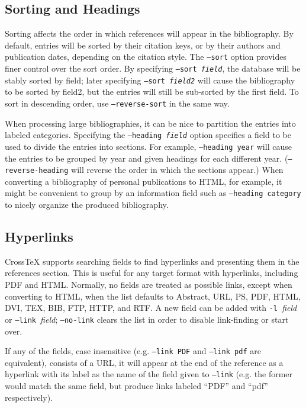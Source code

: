 \documentclass{article}
\newcommand{\XTX}{Cross\TeX}
\begin{document}
\subsection{Sorting and Headings}

Sorting affects the order in which references will appear in the
bibliography.  By default, entries will be sorted by their citation keys,
or by their authors and publication dates, depending on the citation
style.  The \texttt{--sort} option provides finer control over the
sort order. By specifying \texttt{--sort \textrm{\textit{field}}}, the
database will be stably sorted by field; later specifying \texttt{--sort
\textrm{\textit{field2}}} will cause the bibliography to be sorted by
field2, but the entries will still be sub-sorted by the first field. To
sort in descending order, use \texttt{--reverse-sort} in the same way.

When processing large bibliographies, it can be nice to partition
the entries into labeled categories. Specifying the \texttt{--heading
\textrm{\textit{field}}} option specifies a field to be used to divide
the entries into sections. For example, \texttt{--heading year} will
cause the entries to be grouped by year and given headings for each
different year. (\texttt{--reverse-heading} will reverse the order in
which the sections appear.) When converting a bibliography of personal
publications to HTML, for example, it might be convenient to group by an
information field such as \texttt{--heading category} to nicely organize
the produced bibliography.

\subsection{Hyperlinks}

\XTX{} supports searching fields to find hyperlinks and presenting them
in the references section.  This is useful for any target format with
hyperlinks, including PDF and HTML.  Normally, no fields are treated
as possible links, except when converting to HTML, when the list
defaults to Abstract, URL, PS, PDF, HTML, DVI, TEX, BIB, FTP, HTTP,
and RTF.  A new field can be added with \texttt{-l~}\textit{field} or
\texttt{--link~}\textit{field}; \texttt{--no-link} clears the list in
order to disable link-finding or start over.

If any of the fields, case insensitive (e.g. \texttt{--link~PDF} and
\texttt{--link~pdf} are equivalent), consists of a URL, it will appear
at the end of the reference as a hyperlink with its label as the name
of the field given to \texttt{--link} (e.g. the former would match the
same field, but produce links labeled ``PDF'' and ``pdf'' respectively).
\end{document}
